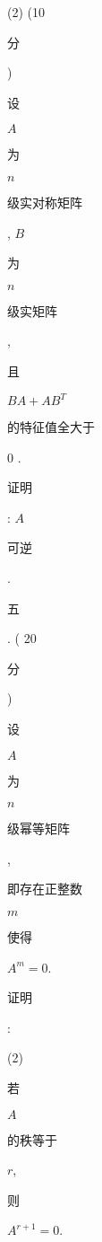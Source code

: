 \documentclass[10pt]{article}
\begin{document}
(2) (10 \begin{CJK}{UTF8}{mj}分\end{CJK}) \begin{CJK}{UTF8}{mj}设\end{CJK} $A$ \begin{CJK}{UTF8}{mj}为\end{CJK} $n$ \begin{CJK}{UTF8}{mj}级实对称矩阵\end{CJK}, $B$ \begin{CJK}{UTF8}{mj}为\end{CJK} $n$ \begin{CJK}{UTF8}{mj}级实矩阵\end{CJK}, \begin{CJK}{UTF8}{mj}且\end{CJK} $B A+A B^{T}$ \begin{CJK}{UTF8}{mj}的特征值全大于\end{CJK} 0 . \begin{CJK}{UTF8}{mj}证明\end{CJK}: $A$ \begin{CJK}{UTF8}{mj}可逆\end{CJK}. \begin{CJK}{UTF8}{mj}五\end{CJK}. ( 20 \begin{CJK}{UTF8}{mj}分\end{CJK}) \begin{CJK}{UTF8}{mj}设\end{CJK} $A$ \begin{CJK}{UTF8}{mj}为\end{CJK} $n$ \begin{CJK}{UTF8}{mj}级幂等矩阵\end{CJK}, \begin{CJK}{UTF8}{mj}即存在正整数\end{CJK} $m$ \begin{CJK}{UTF8}{mj}使得\end{CJK} $A^{m}=0$. \begin{CJK}{UTF8}{mj}证明\end{CJK}:

(2) \begin{CJK}{UTF8}{mj}若\end{CJK} $A$ \begin{CJK}{UTF8}{mj}的秩等于\end{CJK} $r$, \begin{CJK}{UTF8}{mj}则\end{CJK} $A^{r+1}=0$.
\end{document}
